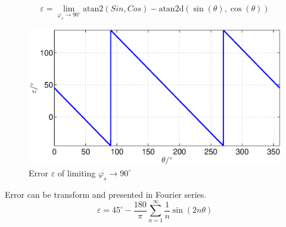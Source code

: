 \documentclass[a4paper]{article}
\begin{document}
\begin{equation}
\label{equ:fis_lim}
\varepsilon = \lim_{\varphi_{s} \rightarrow 90^\circ} \mathrm{atan2}(Sin ,Cos)- \mathrm{atan2d}(\sin(\theta),\cos(\theta))
\end{equation}
\begin{figure}[!htb]
    \begin{center}
        \includegraphics[width=\linewidth]{./Slike/lim_sinfaza.eps}
        \caption{Error $\varepsilon$ of limiting $\varphi_{s} \rightarrow 90^\circ$} \label{fig:lim_sin_fis}
    \end{center}
\end{figure}
Error can be transform and presented in Fourier series.
\begin{equation}
\label{equ:lim_fis_vrsta}
\varepsilon = 45^\circ - \frac{180}{\pi}\sum_{n=1}^{\infty}\frac{1}{n} \sin (2n \theta)
\end{equation}
\end{document}
